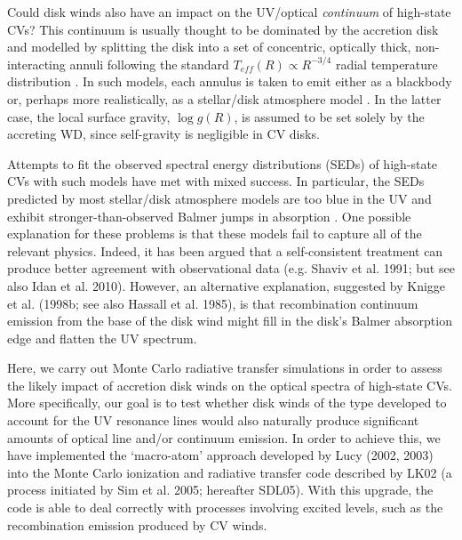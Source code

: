 \documentclass[preprint, a4paper, 11pt]{aastex}
\begin{document}
Could disk winds also have an impact on the UV/optical {\em continuum}
of high-state CVs? This continuum is usually thought to be dominated
by the accretion disk and modelled by splitting the disk into
a set of concentric, optically thick, non-interacting annuli following
the standard $T_{eff}(R) \propto R^{-3/4}$ radial temperature
distribution \citep{shakurasunyaev1973}. In such
models, each annulus is taken to emit either as a blackbody or,
perhaps more realistically, as a stellar/disk atmosphere model
\citep{Schwarzenberg-Czerny1977,wade1984,wade1988}.
In the latter case, the local surface gravity, $\log{g}(R)$, is
assumed to be set solely by the accreting WD, since self-gravity is
negligible in CV disks.


Attempts to fit the observed spectral energy distributions (SEDs) of
high-state CVs with such models have met with mixed success. In
particular, the SEDs predicted by most stellar/disk atmosphere models 
are too blue in the UV \citep{wade1988,long1991,long1994,knigge1998} and exhibit
stronger-than-observed Balmer jumps in absorption 
\citep{wade1984,haug1987,ladous1989b,knigge1998}. One possible
explanation for these problems is that these models fail to capture
all of the relevant physics. Indeed, it has been argued that a
self-consistent treatment can 
produce better agreement with observational data (e.g. Shaviv et
al. 1991;  but see also Idan et al. 2010).
\nocite{idanshaviv2010} \nocite{shaviv1991}
However, an alternative explanation, suggested by Knigge et al.
(1998b; see also Hassall et al. 1985)\nocite{KLWB98,hassall}, 
is that recombination continuum emission from the base of the 
disk wind might fill in the disk's
Balmer absorption edge and flatten the UV spectrum. 

\nocite{groot2004}
\nocite{beuermann1990}
\nocite{beuermann1992}
\nocite{higginbottom2013}

Here, we carry out Monte Carlo radiative transfer simulations in
order to assess the likely impact of accretion disk winds on the
optical spectra of high-state CVs. More specifically, our goal is to
test whether disk winds of the type developed to account for the UV
resonance lines would also naturally produce significant amounts of  
optical line and/or continuum emission. In order to achieve this, we
have implemented the `macro-atom' approach developed by Lucy
(2002, 2003) into the Monte Carlo ionization and radiative transfer
code described by LK02 (a process initiated by Sim et al. 2005; hereafter SDL05). 
With this upgrade, the code is able to deal correctly with processes involving
excited levels, such as the recombination emission produced by CV
winds. 
\end{document}
